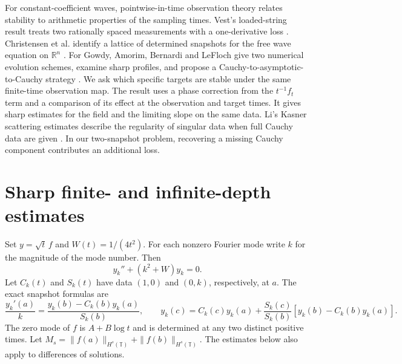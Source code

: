 \documentclass[11pt]{article}
\newcommand{\T}{\mathbb T}
\newcommand{\HS}[1]{H^{#1}(\T)}
\begin{document}
For constant-coefficient waves, pointwise-in-time observation theory
relates stability to arithmetic properties of the sampling times. Vest's
loaded-string result treats two rationally spaced measurements with
a one-derivative loss \cite{szi,vest}. Christensen et al. identify
a lattice of determined snapshots for the free wave equation on
$\mathbb R^n$ \cite[Theorems 2.6--2.7]{snapshot}. For Gowdy,
Amorim, Bernardi and LeFloch give two numerical evolution schemes,
examine sharp profiles, and propose a Cauchy-to-asymptotic-to-Cauchy
strategy \cite[Sections 3 and 4.2.4--4.2.5]{amorim}. We ask which
specific targets are stable under the same finite-time observation map.
The result uses a phase correction from the $t^{-1}f_t$ term and a
comparison of its effect at the observation and target times.
It gives sharp estimates for the field and the limiting slope on the same
data. Li's Kasner scattering estimates describe the regularity of singular
data when full Cauchy data are given \cite[Theorem 1.3]{li}. In our
two-snapshot problem, recovering a missing Cauchy component contributes
an additional loss.

\section{Sharp finite- and infinite-depth estimates}
Set $y=\sqrt t\,f$ and $W(t)=1/(4t^2)$. For each nonzero Fourier mode
write $k$ for the magnitude of the mode number. Then
\begin{equation}
 y_k''+(k^2+W)y_k=0 .
 \label{ode}
\end{equation}
Let $C_k(t)$ and $S_k(t)$ have data $(1,0)$ and $(0,k)$, respectively,
at $a$. The exact snapshot formulas are
\begin{equation}
 \frac{y_k'(a)}{k}=\frac{y_k(b)-C_k(b)y_k(a)}{S_k(b)},\qquad
 y_k(c)=C_k(c)y_k(a)+\frac{S_k(c)}{S_k(b)}
 [y_k(b)-C_k(b)y_k(a)].
 \label{multipliers}
\end{equation}
The zero mode of $f$ is $A+B\log t$ and is determined at any two
distinct positive times. Let $M_s=\|f(a)\|_{\HS{s}}+\|f(b)\|_{\HS{s}}$.
The estimates below also apply to differences of solutions.
\end{document}
